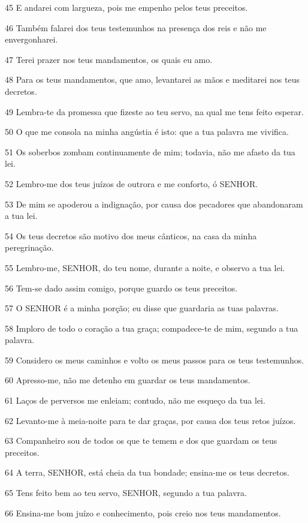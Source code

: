 \par 45 E andarei com largueza, pois me empenho pelos teus preceitos.
\par 46 Também falarei dos teus testemunhos na presença dos reis e não me envergonharei.
\par 47 Terei prazer nos teus mandamentos, os quais eu amo.
\par 48 Para os teus mandamentos, que amo, levantarei as mãos e meditarei nos teus decretos.
\par 49 Lembra-te da promessa que fizeste ao teu servo, na qual me tens feito esperar.
\par 50 O que me consola na minha angústia é isto: que a tua palavra me vivifica.
\par 51 Os soberbos zombam continuamente de mim; todavia, não me afasto da tua lei.
\par 52 Lembro-me dos teus juízos de outrora e me conforto, ó SENHOR.
\par 53 De mim se apoderou a indignação, por causa dos pecadores que abandonaram a tua lei.
\par 54 Os teus decretos são motivo dos meus cânticos, na casa da minha peregrinação.
\par 55 Lembro-me, SENHOR, do teu nome, durante a noite, e observo a tua lei.
\par 56 Tem-se dado assim comigo, porque guardo os teus preceitos.
\par 57 O SENHOR é a minha porção; eu disse que guardaria as tuas palavras.
\par 58 Imploro de todo o coração a tua graça; compadece-te de mim, segundo a tua palavra.
\par 59 Considero os meus caminhos e volto os meus passos para os teus testemunhos.
\par 60 Apresso-me, não me detenho em guardar os teus mandamentos.
\par 61 Laços de perversos me enleiam; contudo, não me esqueço da tua lei.
\par 62 Levanto-me à meia-noite para te dar graças, por causa dos teus retos juízos.
\par 63 Companheiro sou de todos os que te temem e dos que guardam os teus preceitos.
\par 64 A terra, SENHOR, está cheia da tua bondade; ensina-me os teus decretos.
\par 65 Tens feito bem ao teu servo, SENHOR, segundo a tua palavra.
\par 66 Ensina-me bom juízo e conhecimento, pois creio nos teus mandamentos.
